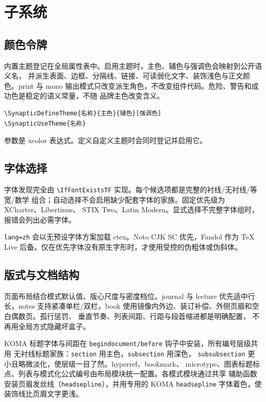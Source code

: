 \documentclass[a4paper,11pt]{scrartcl}
\begin{document}
\section{子系统}

\subsection{颜色令牌}

内置主题登记在全局属性表中。启用主题时，主色、辅色与强调色会映射到公开语义名，
并派生表面、边框、分隔线、链接、可读弱化文字、装饰浅色与正文颜色。print 与 mono
输出模式只改变派生角色，不改变组件代码。危险、警告和成功色是稳定的语义常量，不随
品牌主色改变含义。

\begin{verbatim}
\SynapticDefineTheme{名称}{主色}{辅色}[强调色]
\SynapticUseTheme{名称}
\end{verbatim}

参数是 xcolor 表达式。定义自定义主题时会同时登记并启用它。

\subsection{字体选择}

字体发现完全由 \verb|\IfFontExistsTF| 实现。每个候选项都是完整的衬线/无衬线/等宽/数学
组合；自动选择不会启用缺少配套字体的家族。固定优先级为 XCharter、Libertinus、
STIX Two、Latin Modern。显式选择不完整字体组时，报错会列出必需字体。

\texttt{lang=zh} 会以无预设字体方案加载 ctex。Noto CJK SC 优先，Fandol 作为 TeX Live
后备。仅在优先字体没有原生字形时，才使用受控的伪粗体或伪斜体。

\subsection{版式与文档结构}

页面布局结合模式默认值、版心尺度与密度档位。journal 与 lecture 优先适中行长，notes
支持紧凑单栏/双栏，book 使用镜像内外边、装订补偿、外侧页眉和空白偶数页。孤行惩罚、
垂直节奏、列表间距、行距与段首缩进都是明确配置，
不再用全局方式隐藏坏盒子。

KOMA 标题字体与间距在 \texttt{begindocument/before} 钩子中安装，所有编号层级共用
无衬线标题家族：\texttt{section} 用主色，\texttt{subsection} 用深色，
\texttt{subsubsection} 更小且略微淡化，使层级一目了然。hyperref、bookmark、
microtype、图表标题标点、列表与模式化公式编号由布局模块统一配置。各模式模块通过共享
辅助函数安装页眉发丝线（\texttt{headsepline}），并用专用的 KOMA
\texttt{headsepline} 字体着色，使装饰线比页眉文字更浅。
\end{document}
